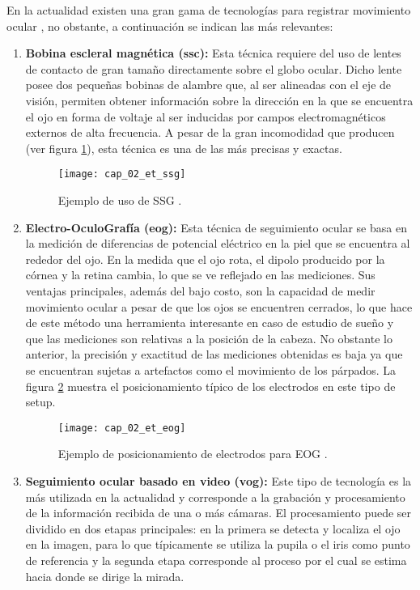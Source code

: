 \documentclass[../main.tex]{subfiles}
\begin{document}
				En la actualidad existen una gran gama de tecnologías para registrar movimiento ocular \cite{article:eyetracker_eggert, article:eyetracker_richardson, dissertation:eyetrackers}, no obstante, a continuación se indican las más relevantes: 
				\begin{enumerate}
					\item \textbf{Bobina escleral magnética (\acrshort{ssc}):} Esta técnica requiere del uso de lentes de contacto de gran tamaño directamente sobre el globo ocular. Dicho lente posee dos pequeñas bobinas de alambre que, al ser alineadas con el eje de visión, permiten obtener información sobre la dirección en la que se encuentra el ojo en forma de voltaje al ser inducidas por campos electromagnéticos externos de alta frecuencia. A pesar de la gran incomodidad que producen (ver figura \ref{fig:02_et_ssc}), esta técnica es una de las más precisas y exactas. 
					\begin{figure}[H]
						\centering
						\texttt{[image: cap\_02\_et\_ssg]}
						\caption{Ejemplo de uso de SSG \cite{website:etSSG}.}
						\label{fig:02_et_ssc}
					\end{figure}

					\item \textbf{Electro-OculoGrafía (\acrshort{eog}):} Esta técnica de seguimiento ocular se basa en la medición de diferencias de potencial eléctrico en la piel que se encuentra al rededor del ojo. En la medida que el ojo rota, el dipolo producido por la córnea y la retina cambia, lo que se ve reflejado en las mediciones. Sus ventajas principales, además del bajo costo, son la capacidad de medir movimiento ocular a pesar de que los ojos se encuentren cerrados, lo que hace de este método una herramienta interesante en caso de estudio de sueño y que las mediciones son relativas a la posición de la cabeza. No obstante lo anterior, la precisión y exactitud de las mediciones obtenidas es baja ya que se encuentran sujetas a artefactos como el movimiento de los párpados. La figura \ref{fig:02_et_eog} muestra el posicionamiento típico de los electrodos en este tipo de setup. 
					\begin{figure}[H]
						\centering
						\texttt{[image: cap\_02\_et\_eog]}
						\caption{Ejemplo de posicionamiento de electrodos para EOG \cite{website:etEOG}.}
						\label{fig:02_et_eog}
					\end{figure}

					\item \textbf{Seguimiento ocular basado en video (\acrshort{vog}):} Este tipo de tecnología es la más utilizada en la actualidad y corresponde a la grabación y procesamiento de la información recibida de una o más cámaras. El procesamiento puede ser dividido en dos etapas principales: en la primera se detecta y localiza el ojo en la imagen, para lo que típicamente se utiliza la pupila o el iris como punto de referencia y la segunda etapa corresponde al proceso por el cual se estima hacia donde se dirige la mirada. 


\end{enumerate}
\end{document}
